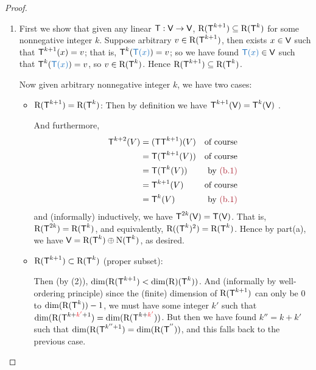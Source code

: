 \begin{proof}
\begin{enumerate}
\item
First we show that given any linear \(\textsf{T} : \textsf{V} \to \textsf{V}\), \(\mathrm{R}(\textsf{T}^{k + 1}) \subseteq \mathrm{R}(\textsf{T}^k)\) for some nonnegative integer \(k\).
Suppose arbitrary \(v \in \mathrm{R}(\textsf{T}^{k + 1})\), then exists \(x \in \textsf{V}\) such that \(\textsf{T}^{k + 1}(x) = v\);
that is, \(\T^k(\BLUE{\T(x)}) = v\);
so we have found \(\BLUE{\T(x)} \in \V\) such that \(\T^k(\BLUE{\T(x)}) = v\), so \(v \in \mathrm{R}(\textsf{T}^k)\).
Hence \(\mathrm{R}(\textsf{T}^{k + 1}) \subseteq \mathrm{R}(\textsf{T}^k)\).

Now given arbitrary nonnegative integer \(k\), we have two cases:
\begin{itemize}
    \item \(\mathrm{R}(\textsf{T}^{k + 1}) = \mathrm{R}(\textsf{T}^k)\): Then by definition we have \(\textsf{T}^{k + 1}(\textsf{V}) = \textsf{T}^k(\textsf{V})\) .
    
    And furthermore,
    \begin{align*}
        \T^{k + 2}(V) & = (\T \T^{k+1})(V) & \text{of course} \\
                      & = \T(\T^{k + 1}(V)) & \text{of course} \\
                      & = \T(\T^k(V)) & \text{by \MAROON{(b.1)}} \\
                      & = \T^{k + 1}(V) & \text{of course} \\
                      & = \T^k(V) & \text{by \MAROON{(b.1)}}
    \end{align*}
    and (informally) inductively, we have \(\textsf{T}^{2k}(\textsf{V}) = \textsf{T}(\textsf{V})\).
    That is, \(\mathrm{R}(\textsf{T}^{2k}) = \mathrm{R}(\textsf{T}^k)\), and equivalently, \(\mathrm{R}((\textsf{T}^k)^2) = \mathrm{R}(\textsf{T}^k)\).
    Hence by part(a), we have \(\textsf{V} = \mathrm{R}(\textsf{T}^k) \oplus \mathrm{N}(\textsf{T}^k)\), as desired.
    
    \item \(\mathrm{R}(\textsf{T}^{k + 1}) \subset \mathrm{R}(\textsf{T}^k)\) (proper subset):

    Then (by (2)), \(\dim(\mathrm{R}(\textsf{T}^{k + 1}) < \dim(\mathrm{R})(\textsf{T}^k))\).
    And (informally by well-ordering principle) since the (finite) dimension of \(\mathrm{R}(\textsf{T}^{k + 1})\) can only be \(0\) to \(\dim(\mathrm{R}(\textsf{T}^k)) - 1\), we must have some integer \(k'\) such that \(\dim(\RANGE(\T^{k + \RED{k'} + 1}) = \dim(\RANGE(\T^{k + \RED{k'}}))\).
    But then we have found \(k'' = k + k'\) such that \(\dim(\mathrm{R}(\textsf{T}^{k'' + 1}) = \dim(\mathrm{R}(\textsf{T}^{''}))\), and this falls back to the previous case.
\end{itemize}
\end{enumerate}
\end{proof}

